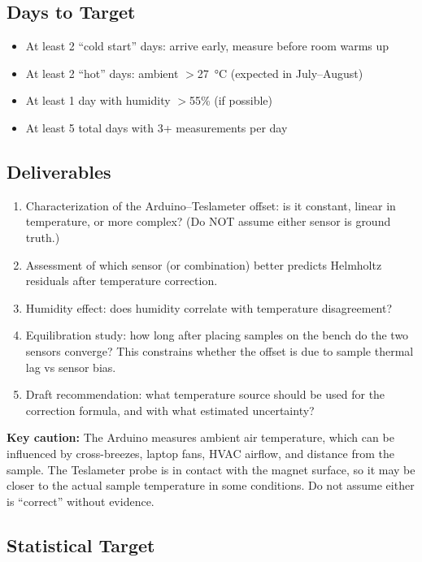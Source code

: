 \documentclass[11pt,letterpaper]{article}
\begin{document}
\subsection{Days to Target}

\begin{itemize}[nosep]
  \item At least 2 ``cold start'' days: arrive early, measure before room warms up
  \item At least 2 ``hot'' days: ambient $>$\SI{27}{\degreeCelsius} (expected in July--August)
  \item At least 1 day with humidity $>$55\% (if possible)
  \item At least 5 total days with 3+ measurements per day
\end{itemize}

\subsection{Deliverables}

\begin{enumerate}[nosep]
  \item Characterization of the Arduino--Teslameter offset: is it constant,
    linear in temperature, or more complex? (Do NOT assume either sensor is
    ground truth.)
  \item Assessment of which sensor (or combination) better predicts Helmholtz
    residuals after temperature correction.
  \item Humidity effect: does humidity correlate with temperature disagreement?
  \item Equilibration study: how long after placing samples on the bench do the
    two sensors converge? This constrains whether the offset is due to sample
    thermal lag vs sensor bias.
  \item Draft recommendation: what temperature source should be used for the
    correction formula, and with what estimated uncertainty?
\end{enumerate}

\textbf{Key caution:} The Arduino measures ambient air temperature, which can be
influenced by cross-breezes, laptop fans, HVAC airflow, and distance from the
sample. The Teslameter probe is in contact with the magnet surface, so it may be
closer to the actual sample temperature in some conditions. Do not assume either
is ``correct'' without evidence.

\subsection{Statistical Target}
\end{document}
